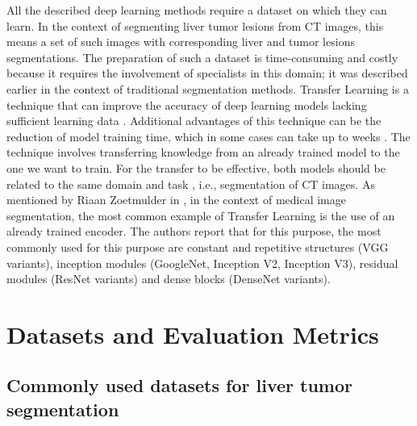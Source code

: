 All the described deep learning methods require a dataset on which they can learn. In the context of segmenting liver tumor lesions from CT images, this means a set of such images with corresponding liver and tumor lesions segmentations. The preparation of such a dataset is time-consuming and costly because it requires the involvement of specialists in this domain; it was described earlier in the context of traditional segmentation methods. Transfer Learning is a technique that can improve the accuracy of deep learning models lacking sufficient learning data \cite{zoetmulder_domain-_2022}. Additional advantages of this technique can be the reduction of model training time, which in some cases can take up to weeks \cite{gut_benchmarking_2022}. The technique involves transferring knowledge from an already trained model to the one we want to train. For the transfer to be effective, both models should be related to the same domain and task \cite{gut_benchmarking_2022}, i.e., segmentation of CT images. As mentioned by Riaan Zoetmulder in \cite{zoetmulder_domain-_2022}, in the context of medical image segmentation, the most common example of Transfer Learning is the use of an already trained encoder. The authors report that for this purpose, the most commonly used for this purpose are 
constant and repetitive structures (VGG variants), inception modules (GoogleNet, Inception V2, Inception V3), residual modules (ResNet variants) and dense blocks (DenseNet variants).

\section{Datasets and Evaluation Metrics}

\subsection{Commonly used datasets for liver tumor segmentation} \label{datasets}

